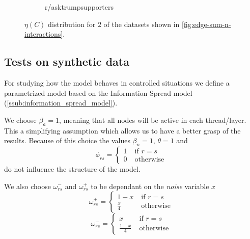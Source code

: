 \begin{figure}
\begin{center}
\begin{subfigure}[b]{0.4\textwidth}
			\caption{r/asktrumpsupporters}
			\label{fig:asktrump-hist-eta}
		\end{subfigure}
	\end{center}
	\caption{$\eta(C)$ distribution for $2$ of the datasets shown in
		\autoref{fig:edge-sum-n-interactions}.}
	\label{fig:eta-distribution-content}
\end{figure}

%


\subsection{Tests on synthetic data}%
\label{sub:testing_on_synthetic_data}

For studying how the model behaves in controlled situations we define a
parametrized model based on the Information Spread model
(\autoref{ssub:information_spread_model}).

We choose $\beta _{a} = 1$, meaning that all nodes will be active in each
thread/layer. This a
simplifying assumption which allows us to have a better grasp of the results.
Because of this choice the values $\beta _n = 1$, $\theta = 1$ and
\begin{equation}
	\phi_{rs}  =
	\begin{cases}
		1 \; & \text{if } r = s  \\
		0 \; & \text{otherwise }
	\end{cases}
\end{equation}
do not influence the structure of the model.

We also choose $\omega ^{-} _{rs}$ and $\omega ^{+} _{rs} $ to be dependant on
the \emph{noise} variable $x$
\begin{equation}
	\omega_{rs}^{+}   =
	\begin{cases}
		1 - x \;        & \text{if } r = s  \\
		\frac{x}{4}  \; & \text{otherwise }
	\end{cases}
\end{equation}
\begin{equation}
	\omega_{rs}^{-}   =
	\begin{cases}
		x \;                & \text{if } r = s  \\
		\frac{1 - x}{4}  \; & \text{otherwise }
	\end{cases}
\end{equation}

